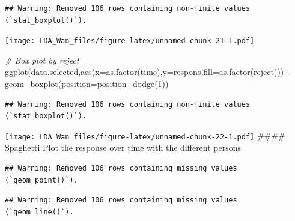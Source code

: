\documentclass[
]{article}
\newenvironment{Shaded}{\begin{snugshade}}{\end{snugshade}}
\newcommand{\AttributeTok}[1]{\textcolor[rgb]{0.77,0.63,0.00}{#1}}
\newcommand{\CommentTok}[1]{\textcolor[rgb]{0.56,0.35,0.01}{\textit{#1}}}
\newcommand{\DecValTok}[1]{\textcolor[rgb]{0.00,0.00,0.81}{#1}}
\newcommand{\FunctionTok}[1]{\textcolor[rgb]{0.00,0.00,0.00}{#1}}
\newcommand{\NormalTok}[1]{#1}
\newcommand{\SpecialCharTok}[1]{\textcolor[rgb]{0.00,0.00,0.00}{#1}}
\begin{document}
\begin{verbatim}
## Warning: Removed 106 rows containing non-finite values (`stat_boxplot()`).
\end{verbatim}

\texttt{[image: LDA\_Wan\_files/figure-latex/unnamed-chunk-21-1.pdf]}

\begin{Shaded}
\begin{Highlighting}[]
\CommentTok{\# Box plot by reject}
\FunctionTok{ggplot}\NormalTok{(data.selected,}\FunctionTok{aes}\NormalTok{(}\AttributeTok{x=}\FunctionTok{as.factor}\NormalTok{(time),}\AttributeTok{y=}\NormalTok{respons,}\AttributeTok{fill=}\FunctionTok{as.factor}\NormalTok{(reject)))}\SpecialCharTok{+} 
  \FunctionTok{geom\_boxplot}\NormalTok{(}\AttributeTok{position=}\FunctionTok{position\_dodge}\NormalTok{(}\DecValTok{1}\NormalTok{))}
\end{Highlighting}
\end{Shaded}

\begin{verbatim}
## Warning: Removed 106 rows containing non-finite values (`stat_boxplot()`).
\end{verbatim}

\texttt{[image: LDA\_Wan\_files/figure-latex/unnamed-chunk-22-1.pdf]}
\#\#\#\# Spaghetti Plot the response over time with the different
persons

\begin{Shaded}
\end{Shaded}

\begin{verbatim}
## Warning: Removed 106 rows containing missing values (`geom_point()`).
\end{verbatim}

\begin{verbatim}
## Warning: Removed 106 rows containing missing values (`geom_line()`).
\end{verbatim}
\end{document}
